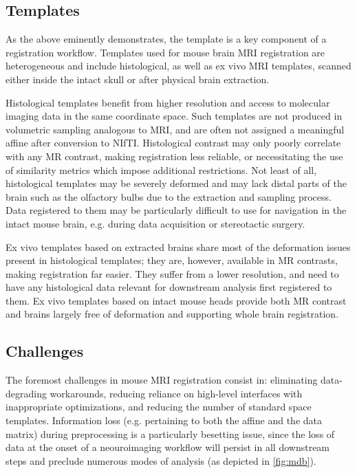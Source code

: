 \subsection{Templates}
As the above eminently demonstrates, the template is a key component of a registration workflow.
Templates used for mouse brain MRI registration are heterogeneous and include histological, as well as ex vivo MRI templates, scanned either inside the intact skull or after physical brain extraction.

Histological templates benefit from higher resolution and access to molecular imaging data in the same coordinate space.
Such templates are not produced in volumetric sampling analogous to MRI, and are often not assigned a meaningful affine after conversion to NIfTI.
Histological contrast may only poorly correlate with any MR contrast, making registration less reliable, or necessitating the use of similarity metrics which impose additional restrictions.
Not least of all, histological templates may be severely deformed and may lack distal parts of the brain such as the olfactory bulbs due to the extraction and sampling process.
Data registered to them may be particularly difficult to use for navigation in the intact mouse brain, e.g. during data acquisition or stereotactic surgery.

Ex vivo templates based on extracted brains share most of the deformation issues present in histological templates;
they are, however, available in MR contrasts, making registration far easier.
They suffer from a lower resolution, and need to have any histological data relevant for downstream analysis first registered to them.
Ex vivo templates based on intact mouse heads provide both MR contrast and brains largely free of deformation and supporting whole brain registration.

\subsection{Challenges}
The foremost challenges in mouse MRI registration consist in: eliminating data-degrading workarounds, reducing reliance on high-level interfaces with inappropriate optimizations, and reducing the number of standard space templates.
Information loss (e.g. pertaining to both the affine and the data matrix) during preprocessing is a particularly besetting issue, since the loss of data at the onset of a neouroimaging workflow will persist in all downstream steps and preclude numerous modes of analysis (as depicted in \cref{fig:mdb}).
